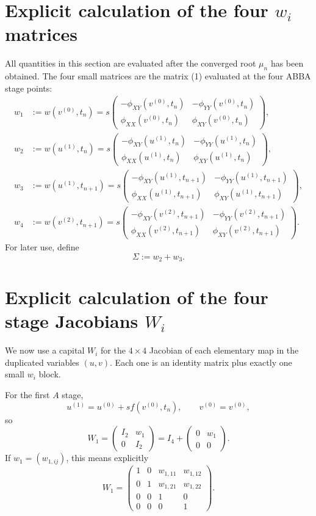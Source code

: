 \documentclass[11pt,a4paper]{article}
\begin{document}
\section{Explicit calculation of the four \texorpdfstring{$w_i$}{wi} matrices}

All quantities in this section are evaluated after the converged root $\mu_n$ has been
obtained. The four small matrices are the matrix (1) evaluated at the four ABBA stage
points:
\begin{align}
 w_1&:=w(v^{(0)},t_n)
 =s\begin{pmatrix}
 -\phi_{XY}(v^{(0)},t_n)&-\phi_{YY}(v^{(0)},t_n)\\
 \phi_{XX}(v^{(0)},t_n)&\phi_{XY}(v^{(0)},t_n)
 \end{pmatrix}, \tag{5a}\\[2mm]
 w_2&:=w(u^{(1)},t_n)
 =s\begin{pmatrix}
 -\phi_{XY}(u^{(1)},t_n)&-\phi_{YY}(u^{(1)},t_n)\\
 \phi_{XX}(u^{(1)},t_n)&\phi_{XY}(u^{(1)},t_n)
 \end{pmatrix}, \tag{5b}\\[2mm]
 w_3&:=w(u^{(1)},t_{n+1})
 =s\begin{pmatrix}
 -\phi_{XY}(u^{(1)},t_{n+1})&-\phi_{YY}(u^{(1)},t_{n+1})\\
 \phi_{XX}(u^{(1)},t_{n+1})&\phi_{XY}(u^{(1)},t_{n+1})
 \end{pmatrix}, \tag{5c}\\[2mm]
 w_4&:=w(v^{(2)},t_{n+1})
 =s\begin{pmatrix}
 -\phi_{XY}(v^{(2)},t_{n+1})&-\phi_{YY}(v^{(2)},t_{n+1})\\
 \phi_{XX}(v^{(2)},t_{n+1})&\phi_{XY}(v^{(2)},t_{n+1})
 \end{pmatrix}. \tag{5d}
\end{align}
For later use, define
\[
 \Sigma:=w_2+w_3.
 \tag{6}
\]

\section{Explicit calculation of the four stage Jacobians \texorpdfstring{$W_i$}{Wi}}

We now use a capital $W_i$ for the $4\times4$ Jacobian of each elementary map in the
duplicated variables $(u,v)$. Each one is an identity matrix plus exactly one small
$w_i$ block.

For the first $A$ stage,
\[
 u^{(1)}=u^{(0)}+s f(v^{(0)},t_n),
 \qquad
 v^{(0)}=v^{(0)},
\]
so
\[
 \boxed{
 W_1=
 \begin{pmatrix}
 I_2&w_1\\
 0&I_2
 \end{pmatrix}
 =I_4+
 \begin{pmatrix}
 0&w_1\\
 0&0
 \end{pmatrix}.
 }
 \tag{7a}
\]
If $w_1=(w_{1,ij})$, this means explicitly
\[
 W_1=
 \begin{pmatrix}
 1&0&w_{1,11}&w_{1,12}\\
 0&1&w_{1,21}&w_{1,22}\\
 0&0&1&0\\
 0&0&0&1
 \end{pmatrix}.
\]
\end{document}
